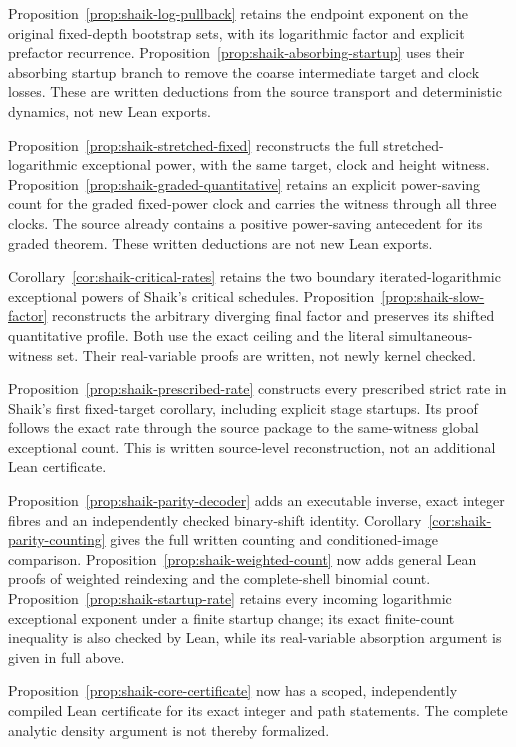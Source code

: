 \documentclass[11pt]{article}
\theoremstyle{remark}\newtheorem{remark}[proposition]{Remark}
\begin{document}
Proposition~\ref{prop:shaik-log-pullback} retains the endpoint exponent
on the original fixed-depth bootstrap sets, with its logarithmic factor
and explicit prefactor recurrence. Proposition~\ref{prop:shaik-absorbing-startup}
uses their absorbing startup branch to remove the coarse intermediate
target and clock losses. These are written deductions from the source
transport and deterministic dynamics, not new Lean exports.

Proposition~\ref{prop:shaik-stretched-fixed} reconstructs the full
stretched-logarithmic exceptional power, with the same target, clock
and height witness. Proposition~\ref{prop:shaik-graded-quantitative}
retains an explicit power-saving count for the graded fixed-power
clock and carries the witness through all three clocks.
The source already contains a positive power-saving antecedent for
its graded theorem. These written deductions are not new Lean exports.

Corollary~\ref{cor:shaik-critical-rates} retains the two boundary
iterated-logarithmic exceptional powers of Shaik's critical schedules.
Proposition~\ref{prop:shaik-slow-factor} reconstructs the arbitrary
diverging final factor and preserves its shifted quantitative profile.
Both use the exact ceiling and the literal simultaneous-witness set.
Their real-variable proofs are written, not newly kernel checked.

Proposition~\ref{prop:shaik-prescribed-rate} constructs every prescribed
strict rate in Shaik's first fixed-target corollary, including explicit
stage startups. Its proof follows the exact rate through the source
package to the same-witness global exceptional count. This is written
source-level reconstruction, not an additional Lean certificate.

Proposition~\ref{prop:shaik-parity-decoder} adds an executable inverse,
exact integer fibres and an independently checked binary-shift identity.
Corollary~\ref{cor:shaik-parity-counting} gives the full written
counting and conditioned-image comparison. Proposition~\ref{prop:shaik-weighted-count}
now adds general Lean proofs of weighted reindexing and the complete-shell
binomial count. Proposition~\ref{prop:shaik-startup-rate} retains every
incoming logarithmic exceptional exponent under a finite startup change;
its exact finite-count inequality is also checked by Lean, while its
real-variable absorption argument is given in full above.

Proposition~\ref{prop:shaik-core-certificate} now has a scoped,
independently compiled Lean certificate for its exact integer and path
statements. The complete analytic density argument is not thereby formalized.
\end{document}

